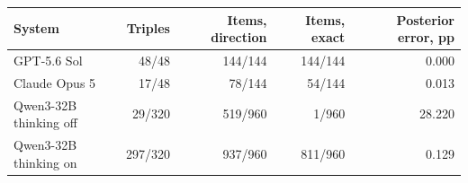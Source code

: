 \begin{tabular}{lrrrr}
\toprule
System & Triples & Items, direction & Items, exact & Posterior error, pp \\
\midrule
GPT-5.6 Sol & 48/48 & 144/144 & 144/144 & 0.000 \\
Claude Opus 5 & 17/48 & 78/144 & 54/144 & 0.013 \\
Qwen3-32B thinking off & 29/320 & 519/960 & 1/960 & 28.220 \\
Qwen3-32B thinking on & 297/320 & 937/960 & 811/960 & 0.129 \\
\bottomrule
\end{tabular}
